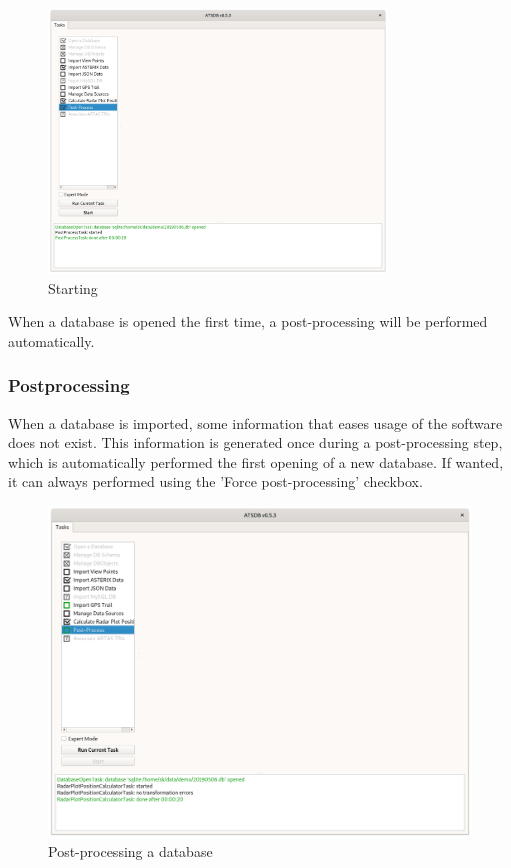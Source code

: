 {\begin{figure}[H]
  \center
    \includegraphics[width=9cm,frame]{../screenshots/start.png}
  \caption{Starting}
\end{figure}

When a database is opened the first time, a post-processing will be performed automatically.

\subsubsection{Postprocessing}
When a database is imported, some information that eases usage of the software does not exist. This information is generated once during a post-processing step, which is automatically performed the first opening of a new database. If wanted, it can always performed using the 'Force post-processing' checkbox.

\begin{figure}[H]
  \hspace*{-2cm}
    \includegraphics[width=18cm,frame]{../screenshots/db_postprocessing.png}
  \caption{Post-processing a database}
  \label{fig:db_postprocessing}
\end{figure}

}
